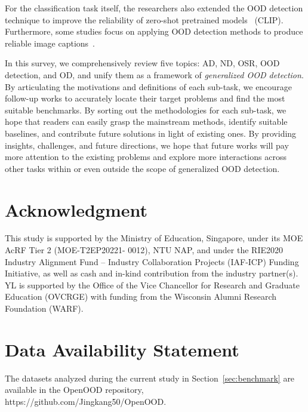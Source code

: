 For the classification task itself, the researchers also extended the OOD detection technique to improve the reliability of zero-shot pretrained models~ (\eg CLIP).
Furthermore, some studies focus on applying OOD detection methods to produce reliable image captions~. 

\label{sec:conclusion}
In this survey, we comprehensively review five topics: AD, ND, OSR, OOD detection, and OD, and unify them as a framework of \emph{generalized OOD detection}. By articulating the motivations and definitions of each sub-task, we encourage follow-up works to accurately locate their target problems and find the most suitable benchmarks.
By sorting out the methodologies for each sub-task, we hope that readers can easily grasp the mainstream methods, identify suitable baselines, and contribute future solutions in light of existing ones.
By providing insights, challenges, and future directions, we hope that future works will pay more attention to the existing problems and explore more interactions across other tasks within or even outside the scope of generalized OOD detection.
\section*{Acknowledgment}
This study is supported by the Ministry of Education, Singapore, under its MOE AcRF Tier 2 (MOE-T2EP20221- 0012), NTU NAP, and under the RIE2020 Industry Alignment Fund – Industry Collaboration Projects (IAF-ICP) Funding Initiative, as well as cash and in-kind contribution from the industry partner(s).
YL is supported by the Office of the Vice Chancellor for Research and Graduate Education (OVCRGE) with funding from the Wisconsin Alumni Research Foundation (WARF).
\section*{Data Availability Statement}
The datasets analyzed during the current study in Section~\ref{sec:benchmark} are available in the OpenOOD repository, https://github.com/Jingkang50/OpenOOD.

   
